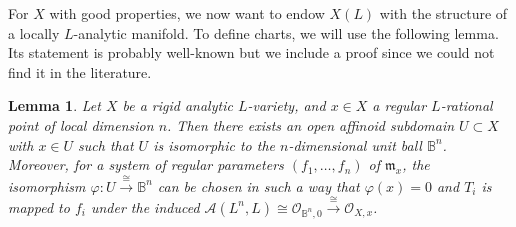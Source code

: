 \documentclass[a4paper, reqno, 10pt]{amsart}
\newtheorem{lemma}[theorem]{Lemma}
\theoremstyle{definition}
\numberwithin{equation}{section}
\newcommand{\BB}{{\mathbb {B}}}
\newcommand{\CA}{{\mathcal {A}}}
\newcommand{\CO}{{\mathcal {O}}}
\newcommand{\Fm}{{\mathfrak {m}}}
\begin{document}
For $X$ with good properties, we now want to endow $X(L)$ with the structure of a locally $L$-analytic manifold.
To define charts, we will use the following lemma. 
Its statement is probably well-known but we include a proof since we could not find it in the literature.


\begin{lemma}\label{Lemma 1 - Existence of polydisc neighbourhood for rigid analytic variety}
	Let $X$ be a rigid analytic $L$-variety, and $x \in X$ a regular $L$-rational point of local dimension $n$.
	Then there exists an open affinoid subdomain $U\subset X$ with $x \in U$ such that $U$ is isomorphic to the $n$-dimensional unit ball $\BB^n$.
	Moreover, for a system of regular parameters $(f_1,\ldots,f_n)$ of $\Fm_x$, the isomorphism $\varphi \colon U \xrightarrow{\cong} \BB^n$ can be chosen in such a way that $\varphi(x) = 0$ and $T_i$ is mapped to $f_i$ under the induced $\CA(L^n,L) \cong \CO_{\BB^n,0} \xrightarrow{\cong} \CO_{X,x}$.
\end{lemma}
\end{document}
